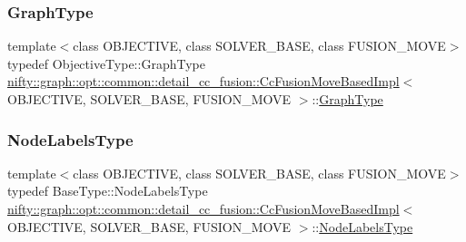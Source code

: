 \subsubsection{\texorpdfstring{Graph\+Type}{GraphType}}
{\footnotesize\ttfamily template$<$class O\+B\+J\+E\+C\+T\+I\+VE, class S\+O\+L\+V\+E\+R\+\_\+\+B\+A\+SE, class F\+U\+S\+I\+O\+N\+\_\+\+M\+O\+VE$>$ \\
typedef Objective\+Type\+::\+Graph\+Type \hyperlink{classnifty_1_1graph_1_1opt_1_1common_1_1detail__cc__fusion_1_1CcFusionMoveBasedImpl}{nifty\+::graph\+::opt\+::common\+::detail\+\_\+cc\+\_\+fusion\+::\+Cc\+Fusion\+Move\+Based\+Impl}$<$ O\+B\+J\+E\+C\+T\+I\+VE, S\+O\+L\+V\+E\+R\+\_\+\+B\+A\+SE, F\+U\+S\+I\+O\+N\+\_\+\+M\+O\+VE $>$\+::\hyperlink{classnifty_1_1graph_1_1opt_1_1common_1_1detail__cc__fusion_1_1CcFusionMoveBasedImpl_a0e280bf72fa47d1419abb10566e5f67e}{Graph\+Type}}

\mbox{\label{classnifty_1_1graph_1_1opt_1_1common_1_1detail__cc__fusion_1_1CcFusionMoveBasedImpl_a4bcaf3e64809f68b1713161641e66c64}} 
\subsubsection{\texorpdfstring{Node\+Labels\+Type}{NodeLabelsType}}
{\footnotesize\ttfamily template$<$class O\+B\+J\+E\+C\+T\+I\+VE, class S\+O\+L\+V\+E\+R\+\_\+\+B\+A\+SE, class F\+U\+S\+I\+O\+N\+\_\+\+M\+O\+VE$>$ \\
typedef Base\+Type\+::\+Node\+Labels\+Type \hyperlink{classnifty_1_1graph_1_1opt_1_1common_1_1detail__cc__fusion_1_1CcFusionMoveBasedImpl}{nifty\+::graph\+::opt\+::common\+::detail\+\_\+cc\+\_\+fusion\+::\+Cc\+Fusion\+Move\+Based\+Impl}$<$ O\+B\+J\+E\+C\+T\+I\+VE, S\+O\+L\+V\+E\+R\+\_\+\+B\+A\+SE, F\+U\+S\+I\+O\+N\+\_\+\+M\+O\+VE $>$\+::\hyperlink{classnifty_1_1graph_1_1opt_1_1common_1_1detail__cc__fusion_1_1CcFusionMoveBasedImpl_a4bcaf3e64809f68b1713161641e66c64}{Node\+Labels\+Type}}

